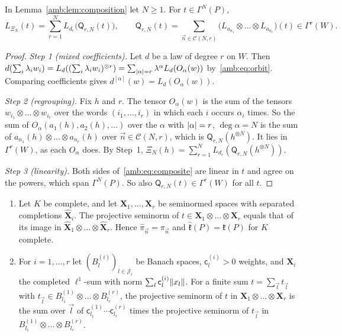\begin{lemma}\label{amb:lem:composite-laws}
In Lemma~\ref{amb:lem:composition} let $N\ge1$. For $t\in\Gamma^N(P)$,
\begin{equation}\label{amb:eq:composite}
 L_{\Xi_N}(t)=\sum_{r=1}^NL_{d_r}\bigl(\mathsf Q_{r,N}(t)\bigr),\qquad
 \mathsf Q_{r,N}(t)=\sum_{\vec n\in\mathcal C(N,r)}\bigl(L_{a_{n_1}}\otimes\dots\otimes L_{a_{n_r}}\bigr)(t)\in\Gamma^r(W).
\end{equation}
\end{lemma}

\begin{proof}
\emph{Step 1 (mixed coefficients).} Let $d$ be a law of degree $r$ on $W$. Then $d(\sum_i\lambda_iw_i)=\allowbreak L_d((\sum_i\lambda_iw_i)^{\otimes r})=\sum_{\lvert \alpha\rvert=r}\lambda^\alpha L_d(O_\alpha(w))$ by~\eqref{amb:eq:orbit}. Comparing coefficients gives $d^{[\alpha]}(w)=L_d(O_\alpha(w))$.

\emph{Step 2 (regrouping).} Fix $h$ and $r$. The tensor $O_\alpha(w)$ is the sum of the tensors $w_{i_1}\otimes\dots\otimes w_{i_r}$ over the words $(i_1,\dots,i_r)$ in which each $i$ occurs $\alpha_i$ times. So the sum of $O_\alpha(a_1(h),a_2(h),\dots)$ over the $\alpha$ with $\lvert \alpha\rvert=r$, $\deg\alpha=N$ is the sum of $a_{n_1}(h)\otimes\dots\otimes a_{n_r}(h)$ over $\vec n\in\mathcal C(N,r)$, which is $\mathsf Q_{r,N}(h^{\otimes N})$. It lies in $\Gamma^r(W)$, as each $O_\alpha$ does. By Step~1, $\Xi_N(h)=\sum_{r=1}^NL_{d_r}(\mathsf Q_{r,N}(h^{\otimes N}))$.

\emph{Step 3 (linearity).} Both sides of~\eqref{amb:eq:composite} are linear in $t$ and agree on the powers, which span $\Gamma^N(P)$. So also $\mathsf Q_{r,N}(t)\in\Gamma^r(W)$ for all $t$.
\end{proof}

\begin{lemma}\label{amb:lem:ell1}
\leavevmode
\begin{enumerate}
\item Let $K$ be complete, and let $\mathbf X_1,\dots,\mathbf X_r$ be seminormed spaces with separated completions $\widehat{\mathbf X}_i$. The projective seminorm of $t\in\mathbf X_1\otimes\dots\otimes\mathbf X_r$ equals that of its image in $\widehat{\mathbf X}_1\otimes\dots\otimes\widehat{\mathbf X}_r$. Hence $\widehat\pi_{\vec n}=\pi_{\vec n}$ and $\widehat{\mathfrak k}(P)=\mathfrak k(P)$ for $K$ complete.
\item For $i=1,\dots,r$ let $(B^{(i)}_l)_{l\in\mathcal J_i}$ be Banach spaces, $\mathsf c^{(i)}_l>0$ weights, and $\mathbf X_i$ the completed $\ell^1$-sum with norm $\sum_l\mathsf c^{(i)}_l\lVert x_l\rVert$. For a finite sum $t=\sum_{\vec l}t_{\vec l}$ with $t_{\vec l}\in B^{(1)}_{l_1}\otimes\dots\otimes B^{(r)}_{l_r}$, the projective seminorm of $t$ in $\mathbf X_1\otimes\dots\otimes\mathbf X_r$ is the sum over $\vec l$ of $\mathsf c^{(1)}_{l_1}\cdots\mathsf c^{(r)}_{l_r}$ times the projective seminorm of $t_{\vec l}$ in $B^{(1)}_{l_1}\otimes\dots\otimes B^{(r)}_{l_r}$.
\end{enumerate}
\end{lemma}

